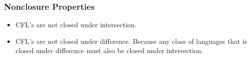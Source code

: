 \subsubsection{Nonclosure Properties}
\begin{itemize}
    \item CFL's are not closed under intersection. 
    \item CFL's are not closed under difference. Because any class of languages that is closed under difference must also be closed under intersection. 
\end{itemize}
